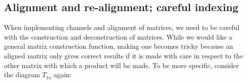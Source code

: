 \documentclass[10pt,twoside]{report}
\begin{document}

	
	\subsection{Alignment and re-alignment; careful indexing}
	When implementing channels and alignment of matrices, we need to be careful with the construction and deconstruction of matrices. While we would like a general matrix construction function, making one becomes tricky because an aligned matrix only gives correct results if it is made with care in respect to the other matrix with which a product will be made. To be more specific, consider the diagram $T_{1a}$ again:
	
\end{document}
